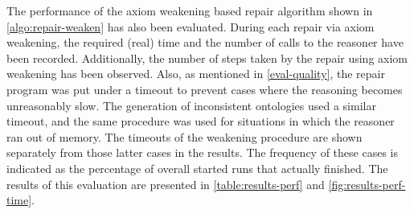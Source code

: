 
The performance of the axiom weakening based repair algorithm shown in \cref{algo:repair-weaken} has also been evaluated. During each repair via axiom weakening, the required (real) time and the number of calls to the reasoner have been recorded. Additionally, the number of steps taken by the repair using axiom weakening has been observed. Also, as mentioned in \cref{eval-quality}, the repair program was put under a timeout to prevent cases where the reasoning becomes unreasonably slow. The generation of inconsistent ontologies used a similar timeout, and the same procedure was used for situations in which the reasoner ran out of memory. The timeouts of the weakening procedure are shown separately from those latter cases in the results. The frequency of these cases is indicated as the percentage of overall started runs that actually finished. The results of this evaluation are presented in \cref{table:results-perf} and \cref{fig:results-perf-time}.

